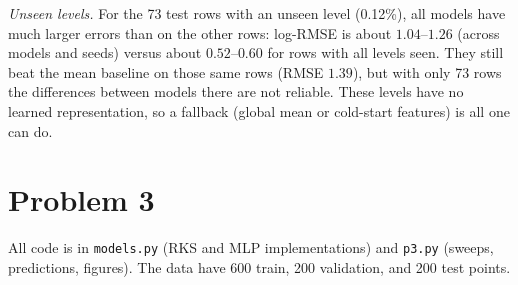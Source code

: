 \documentclass{article}
\newcounter{code}[section]
\begin{document}
\begin{solution}[]
  \emph{Unseen levels.} For the 73 test rows with an unseen level (0.12\%), all models have much larger errors than on the other rows: log-RMSE is about $1.04$--$1.26$ (across models and seeds) versus about $0.52$--$0.60$ for rows with all levels seen. They still beat the mean baseline on those same rows (RMSE $1.39$), but with only 73 rows the differences between models there are not reliable. These levels have no learned representation, so a fallback (global mean or cold-start features) is all one can do.
\end{solution}

\section{Problem 3}

All code is in \texttt{models.py} (RKS and MLP implementations) and \texttt{p3.py} (sweeps, predictions, figures). The data have 600 train, 200 validation, and 200 test points.
\end{document}
